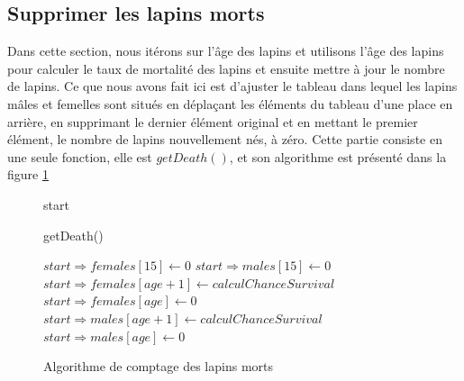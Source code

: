 \documentclass[12pt]{article}
\begin{document}
        \subsection{Supprimer les lapins morts}
        Dans cette section, nous itérons sur l'âge des lapins et utilisons l'âge des lapins pour calculer le taux de mortalité des lapins et ensuite mettre à jour le nombre de lapins. Ce que nous avons fait ici est d'ajuster le tableau dans lequel les lapins mâles et femelles sont situés en déplaçant les éléments du tableau d'une place en arrière, en supprimant le dernier élément original et en mettant le premier élément, le nombre de lapins nouvellement nés, à zéro. Cette partie consiste en une seule fonction, elle est  $getDeath()$, et son algorithme est présenté dans la figure \ref{algo:die}
        
        \begin{figure}[htbp]
            \centering
            \label{algo:die}
            \begin{algorithm}[H]
                \begin{algorithmic}[1]
                    \Require start
                    \caption{getDeath()}
                    \State $start \Rightarrow females[15] \leftarrow 0$
                    \State $start \Rightarrow males[15] \leftarrow 0$
                            \State $start\Rightarrow females[age+1] \leftarrow calculChanceSurvival$
                        \EndFor
                        \State $start \Rightarrow females[age] \leftarrow 0$
                            \State $start\Rightarrow males[age+1] \leftarrow calculChanceSurvival$
                        \EndFor
                        \State $start \Rightarrow males[age] \leftarrow 0$
                    \EndFor
                \end{algorithmic}
            \end{algorithm}
            \caption{Algorithme de comptage des lapins morts}
        \end{figure}
\end{document}
